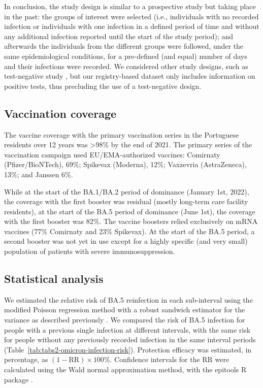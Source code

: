 In conclusion, the study design is similar to a prospective study but taking place in the past: the groups of interest were selected (i.e., individuals with no recorded infection or individuals with one infection in a defined period of time and without any additional infection reported until the start of the study period); and afterwards the individuals from the different groups were followed, under the same epidemiological conditions, for a pre-defined (and equal) number of days and their infections were recorded. We considered other study designs, such as test-negative study \citep{altarawneh2022ProtectiveEffect, ayoub2022EstimatingProtection, hansen2023RiskReinfection}, but our registry-based dataset only includes information on positive tests, thus precluding the use of a test-negative design.

\subsection{Vaccination coverage}

The vaccine coverage with the primary vaccination series in the Portuguese residents over 12 years was >98\% by the end of 2021. The primary series of the vaccination campaign used EU/EMA-authorized vaccines: Comirnaty (Pfizer/BioNTech), 69\%; Spikevax (Moderna), 12\%; Vaxzevria (AstraZeneca), 13\%; and Janssen 6\%.

While at the start of the BA.1/BA.2 period of dominance (January 1st, 2022), the coverage with the first booster was residual (mostly long-term care facility residents), at the start of the BA.5 period of dominance (June 1st), the coverage with the first booster was 82\%. The vaccine boosters relied exclusively on mRNA vaccines (77\% Comirnaty and 23\% Spikevax). At the start of the BA.5 period, a second booster was not yet in use except for a highly specific (and very small) population of patients with severe immunosuppression.

\subsection{Statistical analysis}

We estimated the relative risk of BA.5 reinfection in each sub-interval using the modified Poisson regression method with a robust sandwich estimator for the variance as described previously \citep{zou2004ModifiedPoisson}. We compared the risk of BA.5 infection for people with a previous single infection at different intervals, with the same risk for people without any previously recorded infection in the same interval periods (Table~\ref{tab:tabs2-omicron-infection-risk}). Protection efficacy was estimated, in percentage, as $(1 - \text{RR}) \times 100\%$. Confidence intervals for the RR were calculated using the Wald normal approximation method, with the epitools R package \citep{aragon2020EpitoolsEpidemiology}.

